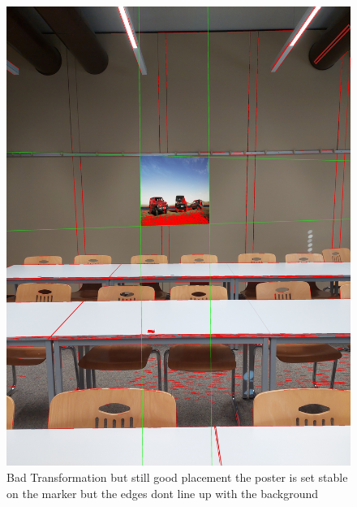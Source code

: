 \documentclass[a4paper,twocolumn]{article}
\begin{document}
\begin{figure}[htbp]
    \centering
    \includegraphics[width=0.9\columnwidth]{img/20221115_113319.jpg} %
    \caption{Bad Transformation but still good placement the poster is set stable on the marker but the edges dont line up with the background }
    \label{fig:20221115_113319.jpg}
    \end{figure}
    
\end{document}
